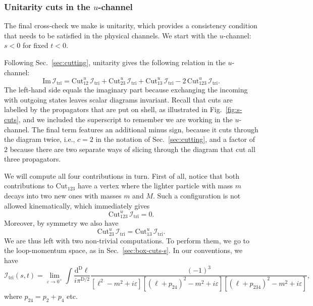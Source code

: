 \documentclass[12pt]{article}
\numberwithin{figure}{section}
\def \be {\begin{equation}}
\def \ee {\end{equation}}
\def \D {\mathrm{D}}
\def \d {\mathrm{d}}
\def \eps {\varepsilon}
\def \I {\mathcal{I}}
\def \Im {\mathrm{Im}}
\def \triangle {\mathrm{tri}}
\def \Cut {\mathrm{Cut}}
\begin{document}
    
    \subsubsection{\label{sec:triangle-u-cuts}Unitarity cuts in the \texorpdfstring{$u$}{u}-channel}
    
    The final cross-check we make is unitarity, which provides a consistency condition that needs to be satisfied in the physical channels. We start with the $u$-channel: $s<0$ for fixed $t<0$.
    
    Following Sec.~\ref{sec:cutting}, unitarity gives the following relation in the $u$-channel:
    \be\label{eq:sum-u-cuts}
    \Im\, \I_{\triangle} = \Cut_{12}^u\, \I_{\triangle} + \Cut_{23}^u\, \I_{\triangle} + \Cut_{13}^u\, \I_{\triangle}  -2\,\Cut_{123}^u\, \I_{\triangle}.
    \ee
    The left-hand side equals the imaginary part because exchanging the incoming with outgoing states leaves scalar diagrams invariant. Recall that cuts are labelled by the propagators that are put on shell, as illustrated in Fig.~\ref{fig:s-cuts}, and we included the superscript to remember we are working in the $u$-channel. The final term features an additional minus sign, because it cuts through the diagram twice, i.e., $c=2$ in the notation of Sec.~\ref{sec:cutting}, and a factor of $2$ because there are two separate ways of slicing through the diagram that cut all three propagators.
    
    We will compute all four contributions in turn. First of all, notice that both contributions to $\Cut_{123}$ have a vertex where the lighter particle with mass $m$ decays into two new ones with masses $m$ and $M$. Such a configuration is not allowed kinematically, which immediately gives
    \be
    \Cut_{123}^u\, \I_{\triangle} = 0.
    \ee
    Moreover, by symmetry we also have
    \be
    \Cut_{23}^u\, \I_{\triangle} = \Cut_{13}^u\, \I_{\triangle}.
    \ee
    We are thus left with two non-trivial computations. To perform them, we go to the loop-momentum space, as in Sec.~\ref{sec:box-cuts-s}. In our conventions, we have
    \begin{equation}
        \I_\triangle(s,t) = \lim_{\eps \to 0^+} \int \frac{\d^\D \ell}{i \pi^{\D/2}}
        \frac{(-1)^3}{[\ell^2 - m^2 + i\varepsilon][\left(\ell+p_{24}\right)^2 - m^2 + i\varepsilon][\left(\ell+p_{234}\right)^2 - m^2 + i\varepsilon]},
        \label{eq:momtriintegral}
    \end{equation}
    where $p_{24} = p_2 + p_4$ etc.
    
\end{document}
